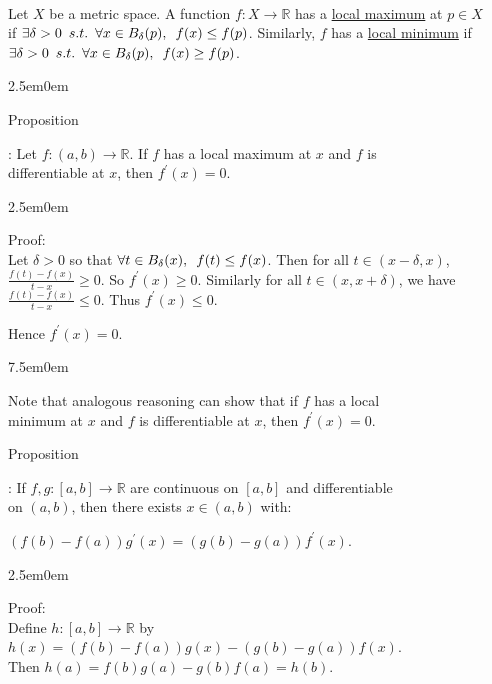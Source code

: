 \documentclass{book}
\newcommand{\hOne}{%
   \color{Black}%
   \fontsize{14}{16}\selectfont%
}
\newcommand{\hTwo}{%
   \color{MidnightBlue}%
   \fontsize{13}{15}\selectfont%
}
\newcommand{\hThree}{%
   \color{PineGreen!85!Orange}
   \fontsize{13}{15}\selectfont%
}
\newcommand{\hFour}{%
   \color{Cerulean}
   \fontsize{12}{14}\selectfont%
}
\newenvironment{myIndent}{%
   \begin{adjustwidth}{2.5em}{0em}%
}{%
   \end{adjustwidth}%
}
\newenvironment{myTindent}{%
   \begin{adjustwidth}{7.5em}{0em}%
}{%
   \end{adjustwidth}%
}
\newcommand{\udefine}[1]{{%
   \setulcolor{Red}%
   \setul{0.14em}{0.07em}%
   \ul{#1}%
}}
\newcommand{\suchthat}{ \hspace{0.5em}s.t.\hspace{0.5em}}
\newcommand{\myHS}{ \hspace{0.5em}}
\newcounter{PropNumber}
\newcommand{\propCount}[1][1]{%
   \addtocounter{PropNumber}{#1}%
   \thePropNumber%
}
\newcommand{\mySepTwo}[1][.]{%
   {\noindent\color{#1}{\rule{6.5in}{0.5mm}}}\\%
}
\newcommand{\retTwo}{\hfill\bigbreak}
\begin{document}
\mySepTwo

\newpage

\hOne Let $X$ be a metric space. A function $f: X \longrightarrow \mathbb{R}$ has a \udefine{local maximum} at $p \in X$\\ if $\exists \delta > 0 \suchthat \forall x \in B_\delta(p),\myHS f(x) \leq f(p)$. Similarly, $f$ has a \udefine{local minimum} if\\ $\exists \delta > 0 \suchthat \forall x \in B_\delta(p),\myHS f(x) \geq f(p)$.\retTwo

{\begin{myIndent}\hTwo
   Proposition \propCount: Let $f: (a, b) \longrightarrow \mathbb{R}$. If $f$ has a local maximum at $x$ and $f$ is\\ differentiable at $x$, then $f^\prime(x) = 0$.\retTwo
   {\begin{myIndent} \hThree
      Proof:\\
      Let $\delta > 0$ so that $\forall t \in B_\delta(x),\myHS f(t) \leq f(x)$. Then for all $t \in (x-\delta, x)$,\\ $\frac{f(t) - f(x)}{t-x} \geq 0$. So $f^\prime(x) \geq 0$. Similarly for all $t \in (x, x+\delta)$, we have\\ $\frac{f(t) - f(x)}{t - x} \leq 0$. Thus $f^\prime(x) \leq 0$.\retTwo

      Hence $f^\prime(x) = 0$.\retTwo

      
      {\begin{myTindent} \hFour
         Note that analogous reasoning can show that if $f$ has a local\\ minimum at $x$ and $f$ is differentiable at $x$, then $f^\prime(x) = 0$.\retTwo
      \end{myTindent}}
   \end{myIndent}}

   Proposition \propCount: If $f, g: [a, b] \longrightarrow \mathbb{R}$ are continuous on $[a, b]$ and differentiable\\ on $(a, b)$, then there exists $x \in (a, b)$ with:
   
   {\centering$(f(b) - f(a))g^\prime(x) = (g(b) - g(a))f^\prime(x)$.\retTwo\par}

   {\begin{myIndent} \hThree
      Proof:\\
      Define $h: [a, b] \longrightarrow \mathbb{R}$ by $h(x) = (f(b) - f(a))g(x) - (g(b) - g(a))f(x)$.\\ Then $h(a) = f(b)g(a) - g(b)f(a) = h(b)$.\retTwo


\end{myIndent}}
\end{myIndent}}
\end{document}
